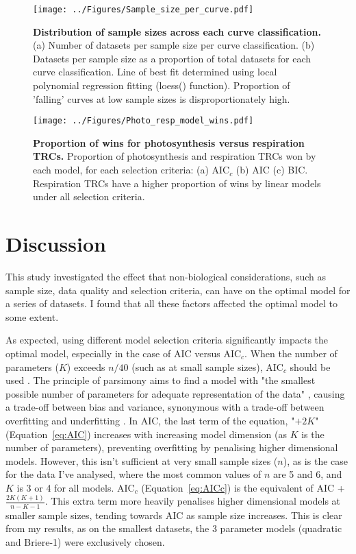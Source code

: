 \documentclass[11pt, a4paper]{article}
\begin{document}
\begin{figure} [H]
	\texttt{[image: ../Figures/Sample\_size\_per\_curve.pdf]}
	\caption{\label{fig:sample_size_per_curve} \textbf{Distribution of sample sizes across each curve classification.} (a) Number of datasets per sample size per curve classification. (b) Datasets per sample size as a proportion of total datasets for each curve classification. Line of best fit determined using local polynomial regression fitting (loess() function). Proportion of 'falling' curves at low sample sizes is disproportionately high.}
\end{figure}

\begin{figure} [H]
	\texttt{[image: ../Figures/Photo\_resp\_model\_wins.pdf]}
	\caption{\label{fig:photo_resp_model} \textbf{Proportion of wins for photosynthesis versus respiration TRCs.} Proportion of photosynthesis and respiration TRCs won by each model, for each selection criteria: (a) AIC$_c$ (b) AIC (c) BIC. Respiration TRCs have a higher proportion of wins by linear models under all selection criteria.}
\end{figure}


\section{Discussion}

This study investigated the effect that non-biological considerations, such as sample size, data quality and selection criteria, can have on the optimal model for a  series of datasets. I found that all these factors affected the optimal model to some extent.

As expected, using different model selection criteria significantly impacts the optimal model, especially in the case of AIC versus AIC$_c$. When the number of parameters ($K$) exceeds $n/40$ (such as at small sample sizes), AIC$_c$ should be used \cite{johnsonModelSelectionEcology2004}. The principle of parsimony aims to find a model with "the smallest possible number of parameters for adequate representation of the data" \cite{burnhamModelSelectionMultimodel2002}, causing a trade-off between bias and variance, synonymous with a trade-off between overfitting and underfitting \cite{burnhamModelSelectionMultimodel2002}. In AIC, the last term of the equation, "$+2K$" (Equation~\ref{eq:AIC}) increases with increasing model dimension (as $K$ is the number of parameters), preventing overfitting by penalising higher dimensional models. However, this isn't sufficient at very small sample sizes ($n$), as is the case for the data I've analysed, where the most common values of $n$ are 5 and 6, and $K$ is 3 or 4 for all models. AIC$_c$ (Equation~\ref{eq:AICc}) is the equivalent of AIC + $\frac{2K(K+1)}{n-K-1}$. This extra term more heavily penalises higher dimensional models at smaller sample sizes, tending towards AIC as sample size increases. This is clear from my results, as on the smallest datasets, the 3 parameter models (quadratic and Briere-1) were exclusively chosen.
\end{document}
